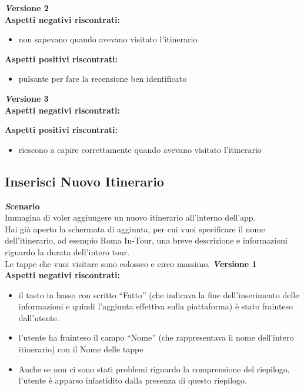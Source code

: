 \textbf{\emph Versione 2}\\
\textbf{Aspetti negativi riscontrati:}
\begin{itemize}[label=-]

\item non sapevano quando avevano visitato l'itinerario

\end{itemize}

\textbf{Aspetti positivi riscontrati:}
\begin{itemize}[label=-]

\item pulsante per fare la recensione ben identificato

\end{itemize}

\textbf{\emph Versione 3}\\
\textbf{Aspetti negativi riscontrati:}
\newline\newline

\textbf{Aspetti positivi riscontrati:}
\begin{itemize}[label=-]

\item riescono a capire correttamente quando avevano visitato l'itinerario

\end{itemize}


\subsection{Inserisci Nuovo Itinerario}
\textbf{\emph Scenario}\\
Immagina di voler aggiungere un nuovo itinerario all’interno dell’app.\\
Hai già aperto la schermata di aggiunta, per cui vuoi specificare il nome dell’itinerario, ad esempio Roma In-Tour, una breve descrizione e informazioni riguardo la durata dell’intero tour.\\
Le tappe che vuoi visitare sono colosseo e circo massimo.
\newline
\textbf{\emph Versione 1}\\
\textbf{Aspetti negativi riscontrati:}
\begin{itemize}[label=-]

\item il tasto in basso con scritto “Fatto” (che indicava la fine dell’inserimento delle
informazioni e quindi l’aggiunta effettiva sulla piattaforma) è stato frainteso
dall’utente.
\item l’utente ha frainteso il campo “Nome” (che rappresentava il nome dell’intero
itinerario) con il Nome delle tappe
\item Anche se non ci sono stati problemi riguardo la comprensione del riepilogo,
l’utente è apparso infastidito dalla presenza di questo riepilogo.

\end{itemize}

